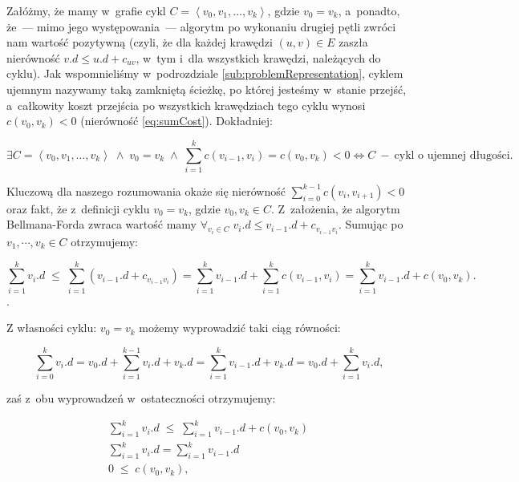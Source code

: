 Załóżmy, że mamy w~grafie cykl $C = \left \langle v_{0}, v_{1}, \ldots, v_{k} \right \rangle $, gdzie $ v_{0} = v_{k}$, a~ponadto, że~---  mimo jego występowania~---  algorytm po wykonaniu drugiej pętli zwróci nam wartość pozytywną \textsf{\KwTrue} (czyli, że dla każdej krawędzi $ \left( u, v \right) \in E $ zaszła nierówność $ v.d \leqslant u.d + c_{uv}$, w~tym i~dla wszystkich krawędzi, należących do cyklu). Jak wspomnieliśmy w~podrozdziale \ref{sub:problemRepresentation}, cyklem ujemnym nazywamy taką zamkniętą ścieżkę, po której jesteśmy w~stanie przejść, a~całkowity koszt przejścia po wszystkich krawędziach tego cyklu wynosi $ c \left( v_{0}, v_{k} \right) < 0 $ (nierówność \ref{eq:sumCost}). Dokładniej:

\begin{equation}
\exists C = \left \langle v_{0}, v_{1}, \ldots, v_{k} \right \rangle \; \wedge \; v_{0} = v_{k} \; \wedge \; \sum _{i=1}^{k} c \left( v_{i-1}, v_{i} \right ) = c \left( v_{0} , v_{k} \right) < 0 \Leftrightarrow C \: - \: \textrm{cykl o~ujemnej długości.}
\end{equation}

Kluczową dla naszego rozumowania okaże się nierówność $\sum _{i=0}^{k-1} c \left( v_{i}, v_{i+1} \right ) < 0$ oraz fakt, że z~definicji cyklu $v_{0} = v_{k}$, gdzie $v_{0}, v_{k} \in C$. Z~założenia, że algorytm Bellmana-Forda zwraca wartość \textsf{\KwTrue} mamy $\forall_{v_{i} \in C} \; v_{i}.d \leqslant v_{i-1}.d + c_{v_{i-1}v_{i}}$. Sumując po $v_{1}, \cdots, v_{k} \in C$ otrzymujemy:

\begin{equation}
\sum _{i=1}^{k} v_{i}.d \; \leqslant \; \sum _{i=1}^{k} \left( v_{i-1}.d + c_{v_{i-1}v_{i}} \right) = \sum _{i=1}^{k} v_{i-1}.d + \sum _{i=1}^{k} c \left( v_{i-1}, v_{i} \right ) = \sum _{i=1}^{k} v_{i-1}.d + c \left( v_{0} , v_{k} \right)\textrm{.}
\end{equation}.

Z własności cyklu: $v_{0} = v_{k}$ możemy wyprowadzić taki ciąg równości:

\begin{equation}
\sum _{i=0}^{k} v_{i}.d = v_{0}.d + \sum _{i=1}^{k-1} v_{i}.d + v_{k}.d = \sum _{i=1}^{k} v_{i-1}.d + v_{k}.d = v_{0}.d + \sum _{i=1}^{k} v_{i}.d\textrm{,}
\end{equation}

zaś z~obu wyprowadzeń w~ostateczności otrzymujemy:

\begin{gather*}
\sum _{i=1}^{k} v_{i}.d \; \leqslant \; \sum _{i=1}^{k} v_{i-1}.d + c \left( v_{0} , v_{k} \right) \\
\sum _{i=1}^{k} v_{i}.d = \sum _{i=1}^{k} v_{i-1}.d \\
0 \; \leqslant \; c \left( v_{0} , v_{k} \right)\textrm{,}
\end{gather*}

